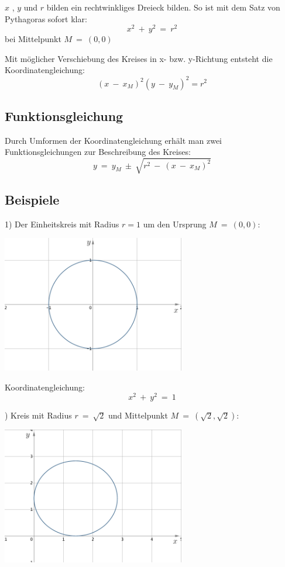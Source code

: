 $ x $ , $ y $ und $ r $ bilden ein rechtwinkliges Dreieck bilden. So ist mit dem Satz von Pythagoras sofort klar:
\[ x^2 \ + \ y^2 \ = \ r^2 \]
bei Mittelpunkt $ M \ = \ (0 , 0) $

Mit möglicher Verschiebung des Kreises in x- bzw. y-Richtung entsteht die Koordinatengleichung:
\[ (x \ - \ x_M)^2 (y \ - \ y_M)^2 = r^2 \]

\subsection{Funktionsgleichung}

Durch Umformen der Koordinatengleichung erhält man zwei Funktionsgleichungen zur Beschreibung des Kreises:
\[ y \ = \ y_M \ \pm \ \sqrt{ r^2 \ - \ (x \ - \ x_M)^2} \]

\subsection{Beispiele}

1)
Der Einheitskreis mit Radius $ r = 1 $ um den Ursprung $ M \ = \ (0 , 0) $:

\begin{center}
\includegraphics[width=0.6\textwidth]{img/Kreis1.png}
\end{center}

Koordinatengleichung:
\[x^2 \ + \ y^2 \ = \ 1 \]

)
Kreis mit Radius $ r \ = \ \sqrt 2 $ und Mittelpunkt $ M \ = \ (\sqrt 2 , \sqrt 2) $:
\nopagebreak
\begin{center}
\includegraphics[width=0.6\textwidth]{img/Kreis2.png}
\end{center}


